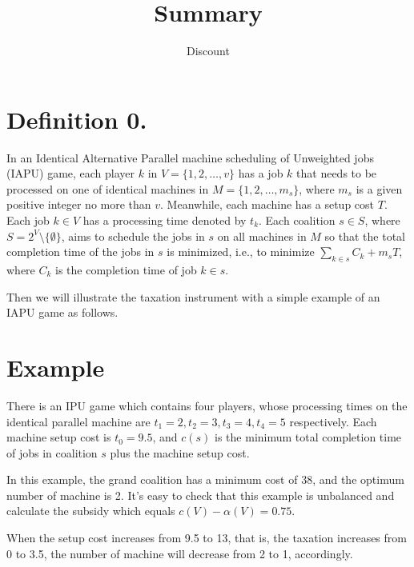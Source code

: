 \documentclass[UTF8]{article}
\title{Summary}
\author{Dis\cdot count}
\begin{document}
\maketitle{}





%



\section*{Definition 0.}
In an Identical Alternative Parallel machine scheduling of Unweighted jobs (IAPU) game, each player $k$ in $V=\{1,2,\ldots,v\}$ has a job $k$ that needs to be processed on one of identical machines in $M=\{1,2,\ldots,m_s\}$, where $m_s$ is a given positive integer no more than $v$. Meanwhile, each machine has a setup cost $T$. Each job $k\in V$ has a processing time denoted by $t_k$. Each coalition $s \in S$, where $S=2^V\setminus\{\emptyset\}$, aims to schedule the jobs in $s$ on all machines in $M$ so that the total completion  time of the jobs in $s$ is minimized, i.e., to minimize $\sum_{k\in s}{C_k}+m_sT $,
where $C_k$ is the completion time of job $k\in s$.


Then we will illustrate the taxation instrument with a simple example of an IAPU game as follows.

\section*{Example}

There is an IPU game which contains four players, whose processing times on the identical parallel machine are $t_1=2, t_2=3, t_3=4, t_4=5$ respectively. Each machine setup cost is $t_0=9.5$, and $c(s)$ is the minimum total completion time of jobs in coalition $s$ plus the machine setup cost.

In this example, the grand coalition has a minimum cost of 38, and the optimum number of machine is 2.
It's easy to check that this example is unbalanced and calculate the subsidy which equals $ c(V) - \alpha(V) = 0.75$.

When the setup cost increases from 9.5 to 13, that is, the taxation increases from 0 to 3.5,
the number of machine will decrease from 2 to 1, accordingly.
\end{document}
